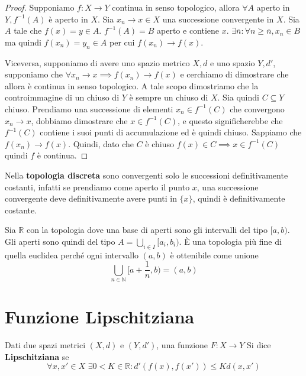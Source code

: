 \begin{proof}
    Supponiamo \(f : X \to  Y\) continua in senso topologico, allora \(\forall
    A\) aperto in \(Y, f^{-1}(A)\) è aperto in \(X\). Sia \(x_{n} \to x \in X\)
    una successione convergente in \(X\). 
    Sia \(A\) tale che \(f(x) = y \in  A\). \(f^{-1}(A) = B\) aperto e contiene
    \(x\). \(\exists  \overline{n} : \forall n \ge \overline{n}, x_{n} \in B\)
    ma quindi \(f(x_{n}) = y_{n} \in A\) per cui \(f(x_{n}) \to f(x)\).

    Viceversa, supponiamo di avere uno spazio metrico \(X, d\) e uno spazio \(Y,
    d'\), supponiamo che \(\forall x_{n} \to  x \implies f(x_{n}) \to  f(x)\) e
    cerchiamo di dimostrare che allora è continua in senso topologico. A tale
    scopo dimostriamo che la controimmagine di un chiuso di \(Y\) è sempre un
    chiuso di \(X\). Sia quindi \(C \subseteq Y\) chiuso. Prendiamo una
    successione di elementi \(x_{n} \in  f^{-1}(C)\) che convergono \(x_{n} \to
    x\), dobbiamo dimostrare che \(x \in  f^{-1}(C)\), e questo significherebbe
    che \(f^{-1}(C)\) contiene i suoi punti di accumulazione ed è quindi chiuso.
    Sappiamo che \(f(x_{n}) \to f(x)\). Quindi, dato che \(C\) è chiuso \(f(x)
    \in C \implies x \in f^{-1}(C)\) quindi \(f\) è continua. 
\end{proof}

\begin{example}
    Nella \textbf{topologia discreta} sono convergenti solo le successioni
    definitivamente costanti, infatti se prendiamo come aperto il punto \(x\),
    una successione convergente deve definitivamente avere punti in \(\{x\} \),
    quindi è definitivamente costante.
\end{example}
\begin{example}
    Sia \(\mathbb{R}\) con la topologia dove una base di aperti sono gli
    intervalli del tipo \([a , b)\). 
    Gli aperti sono quindi del tipo \(A = \bigcup_{i \in  I} [a_{i}, b_{i})\). È
    una topologia più fine di quella euclidea perché ogni intervallo \((a,
    b)\) è ottenibile come unione
    \[
        \bigcup_{n \in  \mathbb{N}} \big[a + \frac{1}{n}, b\big) = (a, b)
    \]
\end{example}

\section{Funzione Lipschitziana}
\begin{definition}
    Dati due spazi metrici \((X, d)\) e \((Y, d')\), una funzione \(F: X \to Y\)
    Si dice \textbf{Lipschitziana} se 
    \[
        \forall x, x' \in X \,\, \exists 0 < K \in \mathbb{R} : d'(f(x), f(x'))
        \le K d(x, x')
    \]
\end{definition}

